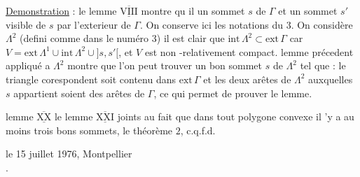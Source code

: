 \uline{Demonstration} : le lemme $\overline{\underline{\mathrm{VIII}}}$ montre qu il  un sommet $s$ de $\Gamma$ et un sommet $s'$ visible de $s$ par l'exterieur de $\Gamma$. On conserve ici les notations du  $3$. On considère $\Lambda^2$ (defini comme dans le numéro $3$) il est clair  %
que $\mathrm{int}\,\Lambda^2\subset\mathrm{ext}\,\Gamma$ car $V=\mathrm{ext}\,\Lambda^1\cup\mathrm{int}\,\Lambda^2\cup{]s,s'[}$, et $V$ est non -relativement compact.  lemme précedent appliqué a $\Lambda^2$ montre que l'on peut trouver un  bon sommet $s$ de $\Lambda^2$ tel que : le triangle corespondent soit contenu dans $\mathrm{ext}\,\Gamma$ et les deux arêtes de $\Lambda^2$ auxquelles  %
$s$ appartient soient des arêtes de $\Gamma$, ce qui permet de prouver le lemme.

 lemme $\overline{\underline{\mathrm{XX}}}$ le lemme $\overline{\underline{\mathrm{XXI}}}$ joints au fait que dans tout polygone convexe il 'y a au moins trois bons sommets,  le théorème $2$, c.q.f.d.

\begin{flushright}
le 15 juillet 1976, Montpellier\\
.
\end{flushright}

